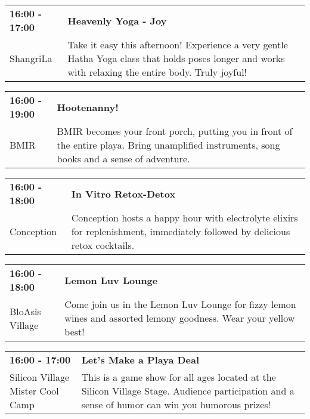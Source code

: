 \begin{tabular}{ p{1in} p{2.2in} }
    \textbf{16:00 - 17:00} & \textbf{Heavenly Yoga - Joy} \\
    ShangriLa \newline  & Take it easy this afternoon! Experience a very gentle Hatha Yoga class that holds poses longer and works with relaxing the entire body. Truly joyful! \\
    \hline 
\end{tabular}
    
\begin{tabular}{ p{1in} p{2.2in} }
    \textbf{16:00 - 19:00} & \textbf{Hootenanny!} \\
    BMIR \newline  & BMIR becomes your front porch, putting you in front of the entire playa. Bring unamplified instruments, song books and a sense of adventure. \\
    \hline 
\end{tabular}
    
\begin{tabular}{ p{1in} p{2.2in} }
    \textbf{16:00 - 18:00} & \textbf{In Vitro Retox-Detox} \\
    Conception \newline  & Conception hosts a happy hour with electrolyte elixirs for replenishment, immediately followed by delicious retox cocktails. \\
    \hline 
\end{tabular}
    
\begin{tabular}{ p{1in} p{2.2in} }
    \textbf{16:00 - 18:00} & \textbf{Lemon Luv Lounge} \\
    BloAsis Village \newline  & Come join us in the Lemon Luv Lounge for fizzy lemon wines and assorted lemony goodness.  Wear your yellow best! \\
    \hline 
\end{tabular}
    
\begin{tabular}{ p{1in} p{2.2in} }
    \textbf{16:00 - 17:00} & \textbf{Let's Make a Playa Deal} \\
    Silicon Village \newline Mister Cool Camp & This is a game show for all ages located at the Silicon Village Stage. Audience participation and a sense of humor can win you humorous prizes! \\
    \hline 
\end{tabular}
    

